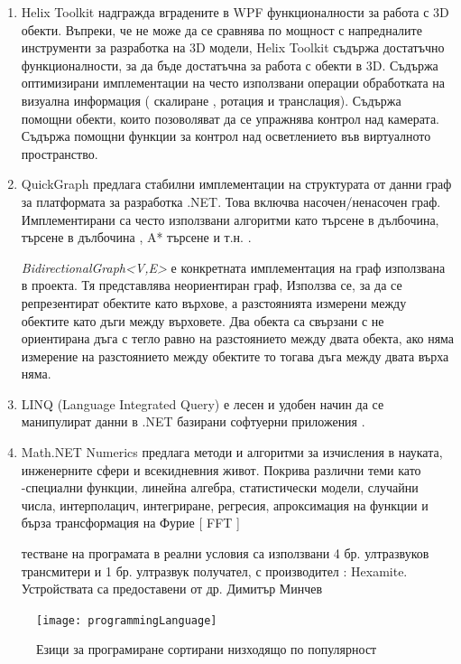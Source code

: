 \begin{enumerate}
    \item Helix Toolkit надгражда вградените в WPF функционалности за работа с 3D обекти. Въпреки, че не може да се сравнява по мощност с напредналите инструменти за разработка на 3D модели, Helix Toolkit съдържа достатъчно функционалности, за да бъде достатъчна за работа с обекти в 3D. Съдържа оптимизирани имплементации на често използвани операции обработката на визуална информация ( скалиране , ротация и транслация). Съдържа помощни обекти, които позоволяват да се упражнява контрол над камерата. Съдържа помощни функции за контрол над осветлението във виртуалното пространство. \cite{helix}
    
    \item QuickGraph предлага стабилни имплементации на структурата от данни граф за платформата за разработка .NET. Това включва насочен/ненасочен граф. Имплементирани са често използвани алгоритми като търсене в дълбочина, търсене в дълбочина , A* търсене и т.н. \cite{quickgraph}.
    
    \textit{BidirectionalGraph<V,E>} е конкретната имплементация на граф използвана в проекта.  Тя представлява неориентиран граф, Използва се, за да се репрезентират обектите като върхове, а разстоянията измерени между обектите като дъги между върховете. Два обекта са свързани с не ориентирана дъга с тегло равно на разстоянието между двата обекта, ако няма измерение на разстоянието между обектите то тогава дъга между двата върха няма.
    
    \item LINQ (Language Integrated Query) е лесен и удобен начин да се манипулират данни в .NET базирани софтуерни приложения \cite{linq}. 
    
    \item Math.NET Numerics предлага методи и алгоритми за изчисления в науката, инженерните сфери и всекидневния живот. Покрива различни теми като -специални функции, линейна алгебра, статистически модели, случайни числа, интерполацич, интегриране, регресия, апроксимация на функции и бърза трансформация на Фурие [ FFT ] \cite{numerics}
    
     тестване на програмата в реални условия са използвани 4 бр. ултразвуков трансмитери и 1 бр. ултразвук получател, с производител : Hexamite. Устройствата са предоставени от др. Димитър Минчев

    
\end{enumerate}


\begin{figure}
    \centering
    \centerline{\texttt{[image: programmingLanguage]}}
    \caption{Езици за програмиране сортирани низходящо по популярност}
    \label{fig:prog}
\end{figure}


